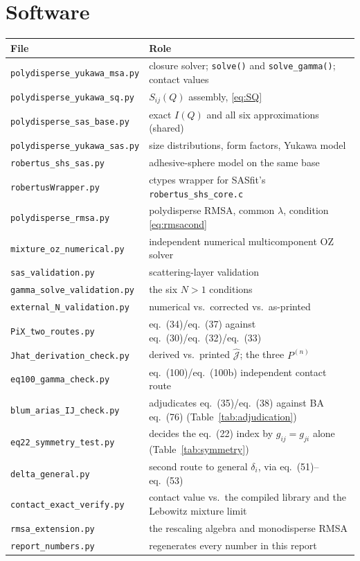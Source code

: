 \documentclass[11pt,a4paper]{article}
\newcommand{\eqBH}[1]{eq.~(#1)}
\newcommand{\code}[1]{\texttt{#1}}
\begin{document}
\section{Software}

\begin{longtable}{@{}ll@{}}
\toprule
File & Role\\
\midrule
\endhead
\code{polydisperse\_yukawa\_msa.py} & closure solver; \code{solve()} and \code{solve\_gamma()}; contact values\\
\code{polydisperse\_yukawa\_sq.py} & $S_{ij}(Q)$ assembly, \eqref{eq:SQ}\\
\code{polydisperse\_sas\_base.py} & exact $I(Q)$ and all six approximations (shared)\\
\code{polydisperse\_yukawa\_sas.py} & size distributions, form factors, Yukawa model\\
\code{robertus\_shs\_sas.py} & adhesive-sphere model on the same base\\
\code{robertusWrapper.py} & ctypes wrapper for SASfit's \code{robertus\_shs\_core.c}\\
\code{polydisperse\_rmsa.py} & polydisperse RMSA, common $\lambda$, condition \eqref{eq:rmsacond}\\
\code{mixture\_oz\_numerical.py} & independent numerical multicomponent OZ solver\\
\midrule
\code{sas\_validation.py} & scattering-layer validation\\
\code{gamma\_solve\_validation.py} & the six $N>1$ conditions\\
\code{external\_N\_validation.py} & numerical vs.\ corrected vs.\ as-printed\\
\code{PiX\_two\_routes.py} & \eqBH{34}/\eqBH{37} against \eqBH{30}/\eqBH{32}/\eqBH{33}\\
\code{Jhat\_derivation\_check.py} & derived vs.\ printed $\hat{\mathcal J}$; the three $P^{(n)}$\\
\code{eq100\_gamma\_check.py} & \eqBH{100}/\eqBH{100b} independent contact route\\
\code{blum\_arias\_IJ\_check.py} & adjudicates \eqBH{35}/\eqBH{38} against BA \eqBH{76} (Table~\ref{tab:adjudication})\\
\code{eq22\_symmetry\_test.py} & decides the \eqBH{22} index by $g_{ij}=g_{ji}$ alone (Table~\ref{tab:symmetry})\\
\code{delta\_general.py} & second route to general $\delta_i$, via \eqBH{51}--\eqBH{53}\\
\code{contact\_exact\_verify.py} & contact value vs.\ the compiled library and the Lebowitz mixture limit\\
\code{rmsa\_extension.py} & the rescaling algebra and monodisperse RMSA\\
\code{report\_numbers.py} & regenerates every number in this report\\
\bottomrule
\end{longtable}
\end{document}
